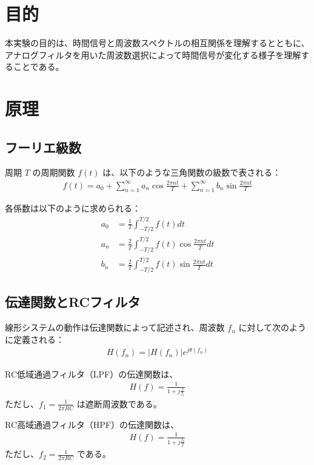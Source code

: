\documentclass[11pt,dvipdfmx]{jarticle}
\begin{document}


\section{目的}
本実験の目的は、時間信号と周波数スペクトルの相互関係を理解するとともに、アナログフィルタを用いた周波数選択によって時間信号が変化する様子を理解することである。

\section{原理}

\subsection{フーリエ級数}
周期 $T$ の周期関数 $f(t)$ は、以下のような三角関数の級数で表される：
\begin{align}
f(t) = a_0 + \sum_{n=1}^{\infty} a_n \cos \frac{2\pi nt}{T} + \sum_{n=1}^{\infty} b_n \sin \frac{2\pi nt}{T}
\end{align}

各係数は以下のように求められる：
\begin{align}
a_0 &= \frac{1}{T} \int_{-T/2}^{T/2} f(t) dt \\
a_n &= \frac{2}{T} \int_{-T/2}^{T/2} f(t) \cos \frac{2\pi nt}{T} dt \\
b_n &= \frac{2}{T} \int_{-T/2}^{T/2} f(t) \sin \frac{2\pi nt}{T} dt
\end{align}

\subsection{伝達関数とRCフィルタ}
線形システムの動作は伝達関数によって記述され、周波数 $f_n$ に対して次のように定義される：
\begin{align}
H(f_n) = |H(f_n)| e^{j\theta(f_n)}
\end{align}

RC低域通過フィルタ（LPF）の伝達関数は、
\begin{align}
H(f) = \frac{1}{1 + j\frac{f}{f_1}}
\end{align}
ただし、$f_1 = \frac{1}{2\pi RC}$ は遮断周波数である。

RC高域通過フィルタ（HPF）の伝達関数は、
\begin{align}
H(f) = \frac{1}{1 + j\frac{f_2}{f}}
\end{align}
ただし、$f_2 = \frac{1}{2\pi RC}$ である。
\end{document}
